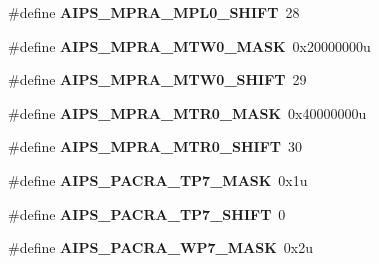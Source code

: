\begin{DoxyCompactItemize}
\item 
\#define {\bfseries A\+I\+P\+S\+\_\+\+M\+P\+R\+A\+\_\+\+M\+P\+L0\+\_\+\+S\+H\+I\+FT}~28\hypertarget{group__AIPS__Register__Masks_gaea845919f2f15a046304226437e9eb60}{}\label{group__AIPS__Register__Masks_gaea845919f2f15a046304226437e9eb60}

\item 
\#define {\bfseries A\+I\+P\+S\+\_\+\+M\+P\+R\+A\+\_\+\+M\+T\+W0\+\_\+\+M\+A\+SK}~0x20000000u\hypertarget{group__AIPS__Register__Masks_ga0919bce3b10414e45d53ac21b329222e}{}\label{group__AIPS__Register__Masks_ga0919bce3b10414e45d53ac21b329222e}

\item 
\#define {\bfseries A\+I\+P\+S\+\_\+\+M\+P\+R\+A\+\_\+\+M\+T\+W0\+\_\+\+S\+H\+I\+FT}~29\hypertarget{group__AIPS__Register__Masks_ga901e75ccb4b546a07d81aa6cd484dc3e}{}\label{group__AIPS__Register__Masks_ga901e75ccb4b546a07d81aa6cd484dc3e}

\item 
\#define {\bfseries A\+I\+P\+S\+\_\+\+M\+P\+R\+A\+\_\+\+M\+T\+R0\+\_\+\+M\+A\+SK}~0x40000000u\hypertarget{group__AIPS__Register__Masks_gaa68ee45071324871f38ab8d2afcc6bef}{}\label{group__AIPS__Register__Masks_gaa68ee45071324871f38ab8d2afcc6bef}

\item 
\#define {\bfseries A\+I\+P\+S\+\_\+\+M\+P\+R\+A\+\_\+\+M\+T\+R0\+\_\+\+S\+H\+I\+FT}~30\hypertarget{group__AIPS__Register__Masks_ga15ba628750b5bb7f2ca634208ee31189}{}\label{group__AIPS__Register__Masks_ga15ba628750b5bb7f2ca634208ee31189}

\item 
\#define {\bfseries A\+I\+P\+S\+\_\+\+P\+A\+C\+R\+A\+\_\+\+T\+P7\+\_\+\+M\+A\+SK}~0x1u\hypertarget{group__AIPS__Register__Masks_ga85e00a1e104ce3b672a6749951d25064}{}\label{group__AIPS__Register__Masks_ga85e00a1e104ce3b672a6749951d25064}

\item 
\#define {\bfseries A\+I\+P\+S\+\_\+\+P\+A\+C\+R\+A\+\_\+\+T\+P7\+\_\+\+S\+H\+I\+FT}~0\hypertarget{group__AIPS__Register__Masks_ga6a599ee35a806abc0e435a625ba44f92}{}\label{group__AIPS__Register__Masks_ga6a599ee35a806abc0e435a625ba44f92}

\item 
\#define {\bfseries A\+I\+P\+S\+\_\+\+P\+A\+C\+R\+A\+\_\+\+W\+P7\+\_\+\+M\+A\+SK}~0x2u\hypertarget{group__AIPS__Register__Masks_ga7e6aad69fad0c48d6a05592319a4b6a2}{}\label{group__AIPS__Register__Masks_ga7e6aad69fad0c48d6a05592319a4b6a2}


\end{DoxyCompactItemize}
